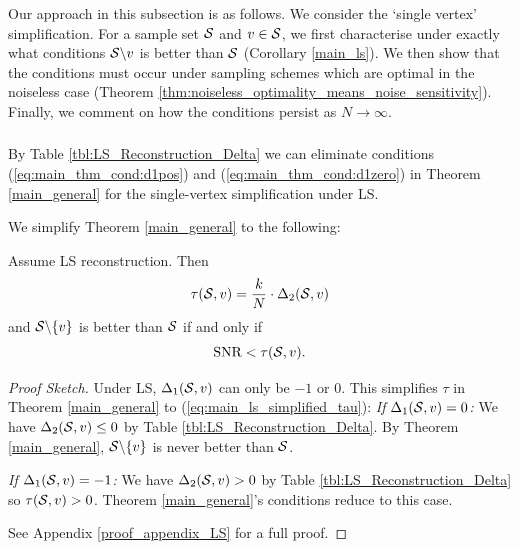 \subsubsection{}
Our approach in this subsection is as follows. We consider the `single vertex' simplification. For a sample set $\mathcal{S}$ and $v\in\mathcal{S}$, we first characterise under exactly what conditions $\mathcal{S} \backslash v$ is better than $\mathcal{S}$ (Corollary \ref{main_ls}). We then show that the conditions must occur under sampling schemes which are optimal in the noiseless case (Theorem \ref{thm:noiseless_optimality_means_noise_sensitivity}). Finally, we comment on how the conditions persist as $N \to \infty$.

\subsubsection{}
By Table \ref{tbl:LS_Reconstruction_Delta} we can eliminate conditions (\ref{eq:main_thm_cond:d1pos}) and (\ref{eq:main_thm_cond:d1zero}) in Theorem \ref{main_general} for the single-vertex simplification under LS.

We simplify Theorem \ref{main_general} to the following:

\begin{corollary}
\label{main_ls}
    Assume LS reconstruction. Then 
    \begin{equation}
        \tau(\mathcal{S},v) = \frac{k}{N} \cdot \Delta_{2}(\mathcal{S},v) \label{eq:main_ls_simplified_tau}
    \end{equation}
    and  $\mathcal{S} \backslash \{v\}$ is better than $\mathcal{S}$ if and only if
 \begin{equation}
 \label{eq:LS_corol_iff}
     \textrm{SNR} < \tau(\mathcal{S},v).
 \end{equation}
 \end{corollary}
\begin{proof}[Proof Sketch]  Under LS, $\Delta_{1}(\mathcal{S},v)$ can only be $-1$ or $0$. This simplifies $\tau$ in Theorem \ref{main_general} to (\ref{eq:main_ls_simplified_tau}):
\newline
    \emph{If $\Delta_{1}(\mathcal{S},v) = 0$: }
    We have $\Delta_{2}(\mathcal{S},v) \leq 0$ by Table \ref{tbl:LS_Reconstruction_Delta}. By Theorem \ref{main_general}, $\mathcal{S} \backslash \{v\}$ is never better than $\mathcal{S}$.
    
    \noindent\emph{If $\Delta_{1}(\mathcal{S},v) = -1$: }
    We have $\Delta_{2}(\mathcal{S},v) > 0$ by Table \ref{tbl:LS_Reconstruction_Delta} so $\tau(\mathcal{S},v) > 0$. Theorem \ref{main_general}'s conditions reduce to this case.
    
\noindent See Appendix \ref{proof_appendix_LS} for a full proof.
\end{proof}

